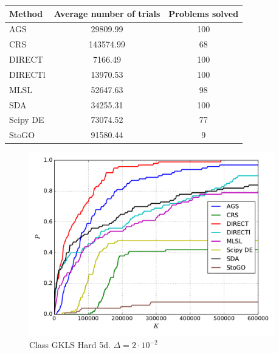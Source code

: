\documentclass[a4paper]{article}
\begin{document}
\begin{tabular}{lcc}
\hline
 Method   &  Average number of trials  &  Problems solved  \\
\hline
 AGS      &          29809.99          &        100        \\
 CRS      &         143574.99          &        68         \\
 DIRECT   &          7166.49           &        100        \\
 DIRECTl  &          13970.53          &        100        \\
 MLSL     &          52647.63          &        98         \\
 SDA      &          34255.31          &        100        \\
 Scipy DE &          73074.52          &        77         \\
 StoGO    &          91580.44          &         9         \\
\hline
\end{tabular}
\begin{figure}[H]
  \center
  \includegraphics[width=0.95\textwidth]{../experiments/gklsh5d/cmc.pdf}
  \caption{Class GKLS Hard 5d. $\Delta=2\cdot10^{-2}$}
\end{figure}
\end{document}
